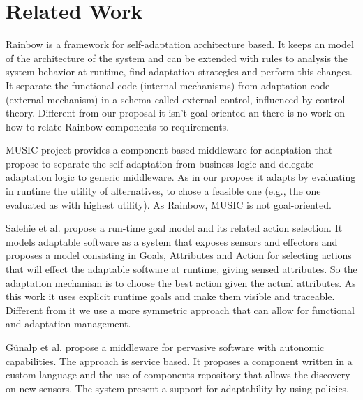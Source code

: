 \section{Related Work}
\label{related}


Rainbow is a framework for self-adaptation architecture based\cite{garlan_rainbow:_2004}. It keeps an model of the architecture of the system and can be extended with rules to analysis the system behavior at runtime, find adaptation strategies and perform this changes. It separate the functional code (internal mechanisms) from adaptation code (external mechanism) in a schema called external control, influenced by control theory. \cite{garlan_software_2009}
Different from our proposal it isn't goal-oriented an there is no work on how to relate Rainbow components to requirements.

MUSIC project provides a component-based middleware for adaptation that propose to separate the self-adaptation from business logic and delegate adaptation logic to generic middleware. As in our propose it adapts by evaluating in runtime the utility of alternatives, to chose a feasible one (e.g., the one evaluated as with highest utility)\cite{rouvoy_music:_2009}. As Rainbow, MUSIC is not goal-oriented.

Salehie et al. \cite{salehie_towards_2012} propose a run-time goal model and its related
action selection. It models adaptable software as a system that exposes sensors and effectors and  proposes a model consisting in Goals, Attributes and Action for selecting actions that will effect the adaptable software at runtime, giving sensed attributes.
So the adaptation mechanism is to choose the best action given the actual attributes.
As this work it uses explicit runtime goals and make them visible and traceable.
Different from it we use a more symmetric approach that can allow for functional
and adaptation management.

Günalp et al. \cite{gunalp_autonomic_2012} propose a middleware for pervasive software with autonomic capabilities. The approach is service based. It proposes a component written in a custom language and the use of components repository that allows the discovery on new sensors. The system present a support for adaptability by using policies.

